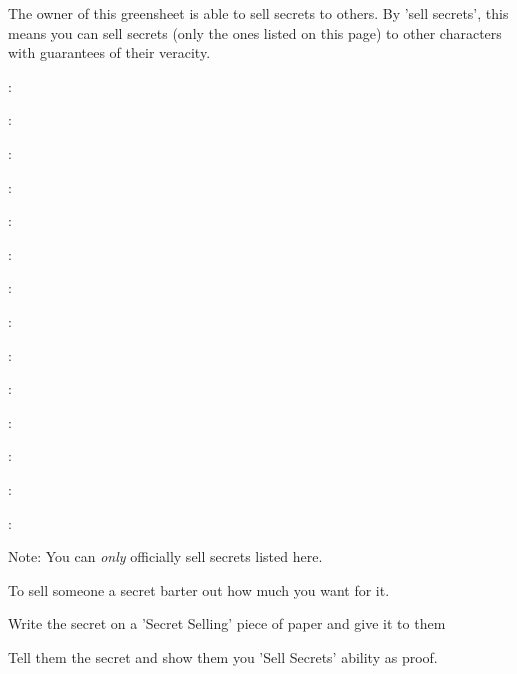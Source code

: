 \documentclass[green]{guildcamp3}
\begin{document}
\name{\gSecrets{}}


The owner of this greensheet is able to sell secrets to others. By 'sell secrets', this means you can sell secrets (only the ones listed on this page) to other characters with guarantees of their veracity. 

\cSciOne{\intro}:

\cSciTwo{\intro}:

\cMageOne{\intro}:

\cMageTwo{\intro}:

\cNobleOne{\intro}:

\cNobleTwo{\intro}:

\cPoliOne{\intro}:

\cPoliTwo{\intro}:

\cRogueOne{\intro}:

\cRogueTwo{\intro}:

\cPaladin{\intro}:

\cTech{\intro}:

\cServant{\intro}:

\cSpecOpOne{\intro}:

Note: You can \emph{only} officially sell secrets listed here.

\begin{enum}[Directions]
  \item To sell someone a secret barter out how much you want for it.
  \item Write the secret on a 'Secret Selling' piece of paper and give it to them 
  \item Tell them the secret and show them you 'Sell Secrets' ability as proof. 
\end{enum}
\end{document}
